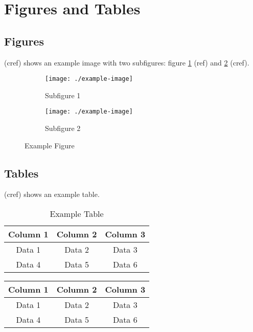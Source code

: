 \documentclass{article}
\begin{document}
\section{Figures and Tables\label{sec:figures_tables}}

\subsection{Figures}
 (cref) shows an example image with two subfigures: figure \ref{fig:subfig1} (ref) and \cref{fig:subfig2} (cref).

\begin{figure}[H]
    \begin{subfigure}[b]{0.5\textwidth}
        \centering
        \texttt{[image: ./example-image]}
        \caption{Subfigure 1}
        \label{fig:subfig1}
    \end{subfigure}
    \begin{subfigure}[b]{0.5\textwidth}
        \centering
        \texttt{[image: ./example-image]}
        \caption{Subfigure 2}
        \label{fig:subfig2}
    \end{subfigure}
    \caption[short caption]{Example Figure}
    \label{fig:example}
\end{figure}

\subsection{Tables}
 (cref) shows an example table.

\begin{table}[H]
    \centering
    \begin{tabular}{|c|c|c|}
        \hline
        Column 1 & Column 2 & Column 3 \\
        \hline
        Data 1 & Data 2 & Data 3 \\
        Data 4 & Data 5 & Data 6 \\
        \hline
    \end{tabular}
    \caption{Example Table}
    \label{tab:example}
\end{table}

\begin{table}[H]
    \centering
    \begin{tabular}{|c|c|c|}
        \hline
        Column 1 & Column 2 & Column 3 \\
        \hline
        Data 1 & Data 2 & Data 3 \\
        Data 4 & Data 5 & Data 6 \\
        \hline
    \end{tabular}
\end{table}
\end{document}
